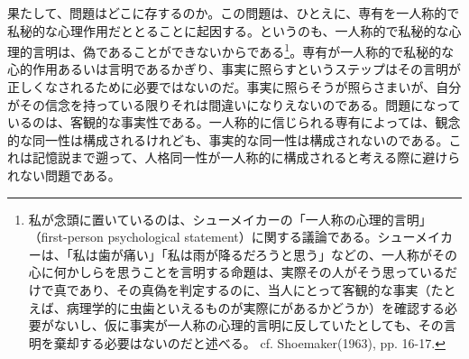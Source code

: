 \documentclass[a4j,oneside]{jsbook}
\begin{document}
\par
果たして、問題はどこに存するのか。この問題は、ひとえに、専有を一人称的で私秘的な心理作用だととることに起因する。というのも、一人称的で私秘的な心理的言明は、偽であることができないからである\footnote{私が念頭に置いているのは、シューメイカーの「一人称の心理的言明」（first-person psychological statement）に関する議論である。シューメイカーは、「私は歯が痛い」「私は雨が降るだろうと思う」などの、一人称がその心に何かしらを思うことを言明する命題は、実際その人がそう思っているだけで真であり、その真偽を判定するのに、当人にとって客観的な事実（たとえば、病理学的に虫歯といえるものが実際にがあるかどうか）を確認する必要がないし、仮に事実が一人称の心理的言明に反していたとしても、その言明を棄却する必要はないのだと述べる。 cf. Shoemaker(1963), pp. 16-17.}。専有が一人称的で私秘的な心的作用あるいは言明であるかぎり、事実に照らすというステップはその言明が正しくなされるために必要ではないのだ。事実に照らそうが照らさまいが、自分がその信念を持っている限りそれは間違いになりえないのである。問題になっているのは、客観的な事実性である。一人称的に信じられる専有によっては、観念的な同一性は構成されるけれども、事実的な同一性は構成されないのである。これは記憶説まで遡って、人格同一性が一人称的に構成されると考える際に避けられない問題である。
\end{document}
